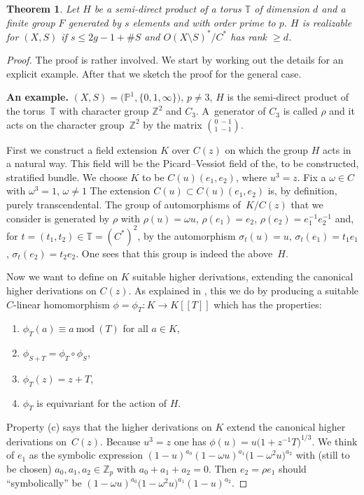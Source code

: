 \documentclass[pdftex]{sigma}
\numberwithin{equation}{section}
\newtheorem{Theorem}{Theorem}[section]
\begin{document}
 \begin{Theorem}\label{2.1} Let $H$ be a semi-direct product of a torus $\mathbb{T}$ of dimension $d$ and a finite group
 $F$ generated by $s$ elements and with order prime to $p$.
 $H$ is realizable for $(X,S)$ if $s\leq 2g-1+\# S$ and
 $O(X\setminus S)^*/C^*$ has rank $\geq d$.
 \end{Theorem}
 \begin{proof} The proof is rather involved. We start by working out the details for an explicit example. After that we sketch the proof for the general case.

{\bf An example.} $(X,S)=\big(\mathbb{P}^1,\{0,1,\infty \}\big)$, $p\neq 3$, $H$ is the semi-direct product of the torus~$\mathbb{T}$ with character group $\mathbb{Z}^2$ and $C_3$. A~generator of $C_3$ is called $\rho$ and it acts on the character group~$\mathbb{Z}^2$ by the matrix ${0\ -1\choose 1\ -1 }$.

First we construct a field extension $K$ over $C(z)$ on which the group $H$ acts in a natural way. This field will be the Picard--Vessiot field of the, to be constructed, stratified bundle. We choose $K$ to be $C(u)(e_1,e_2)$, where $u^3=z$. Fix a $\omega \in C$ with $\omega ^3=1$, $\omega \neq 1$ The extension $C(u)\subset C(u)(e_1,e_2)$ is, by definition, purely transcendental. The group of automorphisms of~$K/C(z)$ that we consider is generated by $\rho$ with $\rho (u)=\omega u$, $\rho (e_1)=e_2$, $\rho(e_2)=e_1^{-1}e_2^{-1}$ and, for $t=(t_1,t_2)\in \mathbb{T}=(C^*)^2$, by the automorphism $\sigma_t(u)=u$, $\sigma_t(e_1)=t_1e_1$, $ \sigma_t(e_2)=t_2e_2$. One sees that this group is indeed the above~$H$.

Now we want to define on $K$ suitable higher derivations, extending the canonical higher derivations on $C(z)$. As explained in \cite[Section~2.1]{Ma-vdP1}, this we do by producing a suitable $C$-linear homomorphism $\phi=\phi _T\colon K\rightarrow K[[T]]$ which has the properties:
\begin{enumerate}\itemsep=0pt
\item[(a)] $\phi_T (a)\equiv a \ \text{mod}\ (T)$ for all $a\in K$,
\item[(b)] $\phi _{S+T}=\phi_T \circ \phi_S$,
\item[(c)] $\phi_T(z)=z+T$,
\item[(d)] $\phi_T$ is equivariant for the action of $H$.
\end{enumerate}
Property (c) says that the higher derivations on $K$ extend the canonical higher derivations on~$C(z)$. Because $u^3=z$ one has $\phi(u)=u\big(1+z^{-1}T\big)^{1/3}$. We think of $e_1$ as the symbolic expres\-sion $(1-u)^{a_0}(1-\omega u)^{a_1}\big(1-\omega ^2u\big)^{a_2}$ with (still to be chosen) $a_0,a_1,a_2\in \mathbb{Z}_p$ with $a_0+a_1+a_2=0$. Then $e_2=\rho e_1$ should ``symbolically'' be $(1-\omega u)^{a_0}\big(1-\omega^2 u\big)^{a_1}(1-u)^{a_2}$.


\end{proof}
\end{document}
